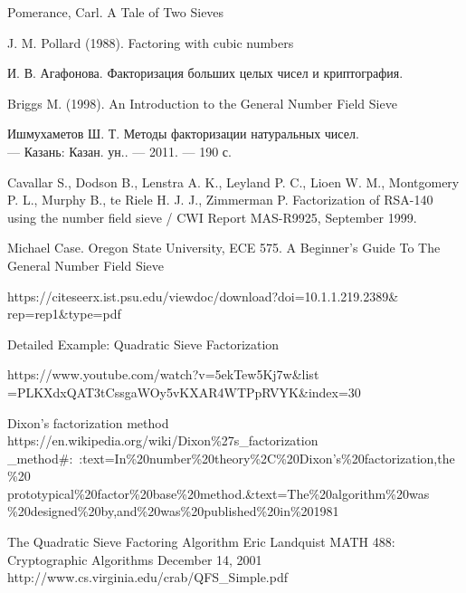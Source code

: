 \begin{thebibliography}{99}

Pomerance, Carl. A Tale of Two Sieves

J. M. Pollard (1988). Factoring with cubic numbers

И. В. Агафонова. Факторизация больших целых чисел и криптография.

Briggs M. (1998). An Introduction to the General Number Field Sieve

Ишмухаметов Ш. Т. Методы факторизации натуральных чисел. \\ — Казань: Казан. ун.. — 2011. — 190 с.

Cavallar S., Dodson B., Lenstra A. K., Leyland P. C., Lioen W. M., Montgomery P. L., Murphy B., te Riele H. J. J., Zimmerman P. Factorization of RSA-140 using the number field sieve / CWI Report MAS-R9925, September 1999.

Michael Case. Oregon State University, ECE 575. A Beginner’s Guide To The General Number Field Sieve 

https://citeseerx.ist.psu.edu/viewdoc/download?doi=10.1.1.219.2389\&\\rep=rep1\&type=pdf

Detailed Example: Quadratic Sieve Factorization

https://www.youtube.com/watch?v=5ekTew5Kj7w\&list\\=PLKXdxQAT3tCssgaWOy5vKXAR4WTPpRVYK\&index=30


Dixon's factorization method
https://en.wikipedia.org/wiki/Dixon\%27s\_factorization\\\_method\#:~:text=In\%20number\%20theory\%2C\%20Dixon's\%20factorization,the\%20\\prototypical\%20factor\%20base\%20method.\&text=The\%20algorithm\%20was\\\%20designed\%20by,and\%20was\%20published\%20in\%201981

The Quadratic Sieve Factoring Algorithm
Eric Landquist
MATH 488: Cryptographic Algorithms
December 14, 2001
http://www.cs.virginia.edu/crab/QFS\_Simple.pdf

\end{thebibliography}